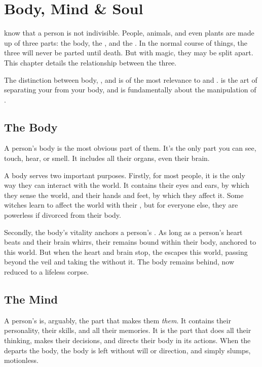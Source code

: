 \chapter{Body, Mind \& Soul}

 know that a person is not indivisible.
People, animals, and even plants are made up of three parts: the body, the {\mind}, and the {\soul}.
In the normal course of things, the three will never be parted until death.
But with magic, they may be split apart.
This chapter details the relationship between the three.

The distinction between body, {\mind}, and {\soul} is of the most relevance to  and .
 is the art of separating your {\mind} from your body, and  is fundamentally about the manipulation of {\souls}.

\section{The Body}

A person's body is the most obvious part of them.
It's the only part you can see, touch, hear, or smell.
It includes all their organs, even their brain.

A body serves two important purposes.
Firstly, for most people, it is the only way they can interact with the world.
It contains their eyes and ears, by which they sense the world, and their hands and feet, by which they affect it.
Some witches learn to affect the world with their {\minds}, but for everyone else, they are powerless if divorced from their body.

Secondly, the body's vitality anchors a person's {\soul}.
As long as a person's heart beats and their brain whirrs, their {\soul} remains bound within their body, anchored to this world.
But when the heart and brain stop, the {\soul} escapes this world, passing beyond the veil and taking the {\mind} without it.
The body remains behind, now reduced to a lifeless corpse.

\section{The Mind}

A person's {\mind} is, arguably, the part that makes them \emph{them}.
It contains their personality, their skills, and all their memories.
It is the part that does all their thinking, makes their decisions, and directs their body in its actions.
When the {\mind} departs the body, the body is left without will or direction, and simply slumps, motionless.

